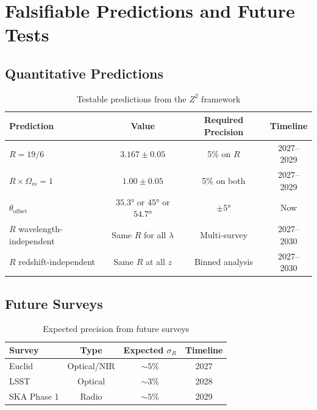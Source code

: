 \documentclass[12pt,a4paper]{article}
\begin{document}
\section{Falsifiable Predictions and Future Tests}

\subsection{Quantitative Predictions}

\begin{table}[H]
\centering
\caption{Testable predictions from the $Z^2$ framework}
\begin{tabular}{lccc}
\toprule
Prediction & Value & Required Precision & Timeline \\
\midrule
$R = 19/6$ & $3.167 \pm 0.05$ & 5\% on $R$ & 2027--2029 \\
$R \times \Omega_m = 1$ & $1.00 \pm 0.05$ & 5\% on both & 2027--2029 \\
$\theta_{\text{offset}}$ & $35.3°$ or $45°$ or $54.7°$ & $\pm 5°$ & Now \\
$R$ wavelength-independent & Same $R$ for all $\lambda$ & Multi-survey & 2027--2030 \\
$R$ redshift-independent & Same $R$ at all $z$ & Binned analysis & 2027--2030 \\
\bottomrule
\end{tabular}
\end{table}

\subsection{Future Surveys}

\begin{table}[H]
\centering
\caption{Expected precision from future surveys}
\begin{tabular}{lccc}
\toprule
Survey & Type & Expected $\sigma_R$ & Timeline \\
\midrule
Euclid & Optical/NIR & $\sim 5\%$ & 2027 \\
LSST & Optical & $\sim 3\%$ & 2028 \\
SKA Phase 1 & Radio & $\sim 5\%$ & 2029 \\
\bottomrule
\end{tabular}
\end{table}
\end{document}
